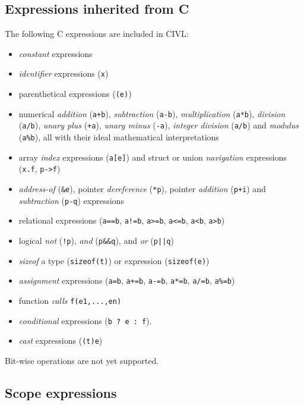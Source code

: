 \subsection{Expressions inherited from C}

The following C expressions are included in CIVL: 
\begin{itemize}
\item \emph{constant} expressions
\item \emph{identifier} expressions (\texttt{x})
\item parenthetical expressions (\verb!(e)!)
\item numerical \emph{addition} (\verb!a+b!), \emph{subtraction} (\verb!a-b!),
  \emph{multiplication} (\verb!a*b!), \emph{division} (\verb!a/b!),
  \emph{unary plus} (\verb!+a!), \emph{unary minus} (\verb!-a!),
  \emph{integer division} (\verb!a/b!) and \emph{modulus} (\verb!a%b!),
  all with their ideal mathematical interpretations
\item array \emph{index} expressions (\verb!a[e]!) and struct or union
  \emph{navigation} expressions (\verb!x.f!, \verb!p->f!)
\item \emph{address-of} (\verb!&e!), pointer \emph{dereference} (\verb!*p!),
  pointer \emph{addition} (\verb!p+i!) and \emph{subtraction} (\verb!p-q!)
  expressions
\item relational expressions (\verb!a==b!, \verb~a!=b~, \verb!a>=b!,
  \verb!a<=b!, \verb!a<b!, \verb!a>b!)
\item logical \emph{not} (\verb~!p~), \emph{and} (\verb!p&&q!), and
  \emph{or} (\verb!p||q!)
\item \emph{sizeof} a type (\verb!sizeof(t)!) or expression (\verb!sizeof(e)!)
\item \emph{assignment} expressions (\verb!a=b!, \verb!a+=b!, \verb!a-=b!,
  \verb!a*=b!, \verb!a/=b!, \verb!a%=b!)
\item function \emph{calls} \verb!f(e1,...,en)!
\item \emph{conditional} expressions (\verb!b ? e : f!).
\item \emph{cast} expressions (\verb!(t)e!)
\end{itemize}

Bit-wise operations are not yet supported.

\subsection{Scope expressions}
\label{sec:scopeexpr}

